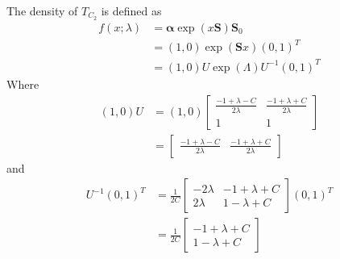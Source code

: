 \documentclass{article}
\theoremstyle{plain}
\theoremstyle{definition}
\theoremstyle{remark}
\numberwithin{equation}{section}
\begin{document}

The density of $T_{C_2}$ is defined as
\begin{align*}
 f(x; \lambda) &= \boldsymbol{\alpha} \exp(x \mathbf{S}) \mathbf{S}_0 \nonumber\\
 &= (1, 0) \exp(\mathbf{S} x) (0,1)^T \\
 &= (1, 0) U \exp(\Lambda) U^{-1} (0,1)^T
\end{align*}
Where
\begin{align*}
    (1,0) U &= (1,0) \begin{bmatrix}
    \frac{-1 + \lambda - C}{2\lambda} & \frac{-1 + \lambda + C}{2\lambda}\\
    1 & 1
\end{bmatrix}\\
    &= \begin{bmatrix}
    \frac{-1 + \lambda - C}{2\lambda} & \frac{-1 + \lambda + C}{2\lambda}
    \end{bmatrix}
\end{align*}
and
\begin{align*}
    U^{-1} (0,1)^T &= \frac{1}{2C} \begin{bmatrix}
    -2\lambda & -1 + \lambda + C\\
    2\lambda & 1 - \lambda + C
    \end{bmatrix} (0,1)^T\\
    &= \frac{1}{2C} \begin{bmatrix}
    -1 + \lambda + C\\
    1 - \lambda + C
    \end{bmatrix}
\end{align*}
\end{document}
